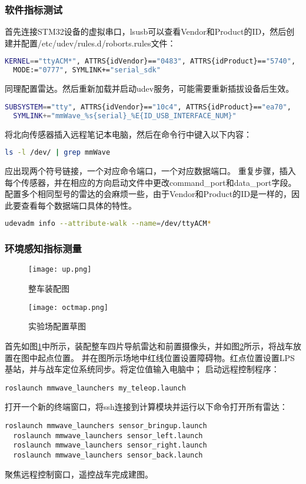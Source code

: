 \documentclass[lang=cn,11pt,a4paper]{elegantpaper}
\begin{document}
\subsubsection{软件指标测试}
首先连接STM32设备的虚拟串口，lsusb可以查看Vendor和Product的ID，然后创建并配置/etc/udev/rules.d/roborts.rules文件：
\begin{lstlisting}[language=bash]
  KERNEL=="ttyACM*", ATTRS{idVendor}=="0483", ATTRS{idProduct}=="5740", 
  MODE:="0777", SYMLINK+="serial_sdk"
\end{lstlisting}
同理配置雷达。然后重新加载并启动udev服务，可能需要重新插拔设备后生效。
\begin{lstlisting}[language=bash]
  SUBSYSTEM=="tty", ATTRS{idVendor}=="10c4", ATTRS{idProduct}=="ea70",
  SYMLINK+="mmWave_%s{serial}_%E{ID_USB_INTERFACE_NUM}"
\end{lstlisting}
将北向传感器插入远程笔记本电脑，然后在命令行中键入以下内容：
\begin{lstlisting}[language=bash]
  ls -l /dev/ | grep mmWave
\end{lstlisting}
应出现两个符号链接，一个对应命令端口，一个对应数据端口。
重复步骤，插入每个传感器，并在相应的方向启动文件中更改command\_port和data\_port字段。
配置多个相同型号的雷达的会麻烦一些，由于Vendor和Product的ID是一样的，因此要查看每个数据端口具体的特性。
\begin{lstlisting}[language=bash]
  udevadm info --attribute-walk --name=/dev/ttyACM*
\end{lstlisting}

\subsubsection{环境感知指标测量}

\begin{figure}[htbp]
  \centering
  \texttt{[image: up.png]}
  \caption{整车装配图}
  \label{fig:car}
\end{figure}

\begin{figure}[htbp]
  \centering
  \texttt{[image: octmap.png]}
  \caption{实验场配置草图}
  \label{fig:octmap}
\end{figure}

首先如图\ref{fig:car}中所示，装配整车四片导航雷达和前置摄像头，并如图\ref{fig:octmap}所示，将战车放置在图中起点位置。
并在图所示场地中红线位置设置障碍物。红点位置设置LPS基站，并与战车定位系统同步。将定位值输入电脑中；
启动远程控制程序：
\begin{lstlisting}[language=ros]
  roslaunch mmwave_launchers my_teleop.launch
\end{lstlisting}
打开一个新的终端窗口，将ssh连接到计算模块并运行以下命令打开所有雷达：
\begin{lstlisting}[language=ros]
  roslaunch mmwave_launchers sensor_bringup.launch
  roslaunch mmwave_launchers sensor_left.launch
  roslaunch mmwave_launchers sensor_right.launch
  roslaunch mmwave_launchers sensor_back.launch
\end{lstlisting}
聚焦远程控制窗口，遥控战车完成建图。
\end{document}

